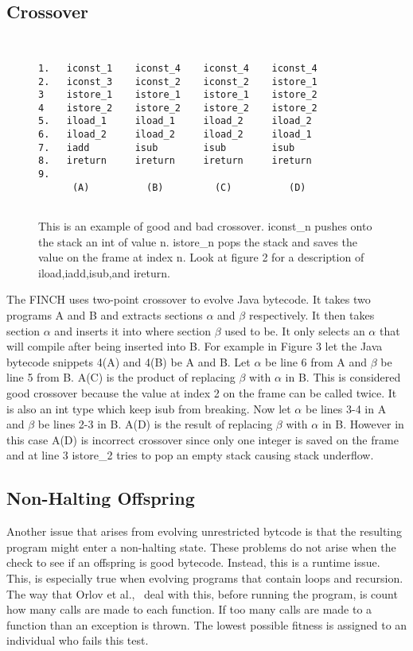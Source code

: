 \documentclass{sig-alternate}
\begin{document}
\subsection{Crossover}

\begin{figure}
\centering
{\tt
\begin{verbatim}
1.   iconst_1    iconst_4    iconst_4    iconst_4
2.   iconst_3    iconst_2    iconst_2    istore_1
3    istore_1    istore_1    istore_1    istore_2
4    istore_2    istore_2    istore_2    istore_2
5.   iload_1     iload_1     iload_2     iload_2
6.   iload_2     iload_2     iload_2     iload_1
7.   iadd        isub        isub        isub
8.   ireturn     ireturn     ireturn     ireturn
9.                          
      (A)          (B)         (C)          (D)
          
\end{verbatim}
}
\caption{This is an example of good and bad crossover. iconst\_n pushes onto the stack an int of value n. istore\_n pops the stack and saves the value on the frame at index n. Look at figure 2 for a description of iload,iadd,isub,and ireturn.}
\end{figure}


The FINCH uses two-point crossover to evolve Java bytecode. It takes two programs A and B and extracts sections $\alpha$ and $\beta$ respectively. It then takes section $\alpha$ and inserts it into where section $\beta$ used to be. It only selects an $\alpha$ that will compile after being inserted into B.
For example in Figure 3 let the Java bytecode snippets 4(A) and 4(B) be A and B. Let $\alpha$ be line 6 from A and $\beta$ be line 5 from B. A(C) is the product of replacing $\beta$ with $\alpha$ in B. This is considered good crossover because the value at index 2 on the frame can be called twice. It is also an int type which keep isub from breaking. Now let $\alpha$ be lines 3-4 in A and $\beta$ be lines 2-3 in B. A(D) is the result of replacing $\beta$ with $\alpha$ in B. However in this case A(D) is incorrect crossover since only one integer is saved on the frame and at line 3 istore\_2 tries to pop an empty stack causing stack underflow. 

\subsection{Non-Halting Offspring}
Another issue that arises from evolving unrestricted bytcode is that the resulting program might enter a non-halting state. These problems do not arise when the check to see if an offspring is good bytecode. Instead, this is a runtime issue. This, is especially true when evolving programs that contain loops and recursion.
The way that Orlov et al.,~\cite{FINCH:2011} deal with this, before running the program, is count how many calls are made to each function. If too many calls are made to a function than an exception is thrown. The lowest possible fitness is assigned to an individual who fails this test.
\end{document}
